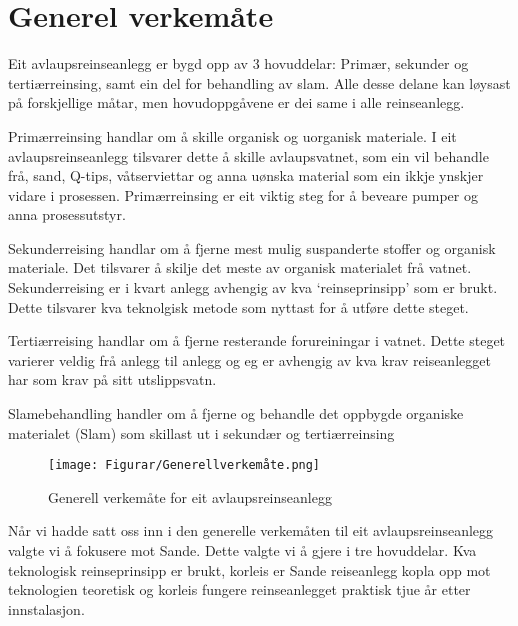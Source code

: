 \section{Generel verkemåte}

Eit avlaupsreinseanlegg er bygd opp av 3 hovuddelar: Primær, sekunder og tertiærreinsing,
samt ein del for behandling av slam.
Alle desse delane kan løysast på forskjellige måtar, men hovudoppgåvene er dei same
i alle reinseanlegg.

Primærreinsing handlar om å skille organisk og uorganisk materiale.
I eit avlaupsreinseanlegg tilsvarer dette å skille avlaupsvatnet, 
som ein vil behandle frå, sand, Q-tips, våtserviettar
og anna uønska material som ein ikkje ynskjer vidare i prosessen. \newline
Primærreinsing er eit viktig steg for å beveare pumper og anna prosessutstyr.

Sekunderreising handlar om å fjerne mest mulig suspanderte stoffer og organisk materiale.
Det tilsvarer å skilje det meste av organisk materialet frå vatnet.
Sekunderreising er i kvart anlegg avhengig av kva `reinseprinsipp' som er brukt. Dette tilsvarer
kva teknolgisk metode som nyttast for å utføre dette steget.

Tertiærreising handlar om å fjerne resterande forureiningar i vatnet.
Dette steget varierer veldig frå anlegg til anlegg og eg er
avhengig av kva krav reiseanlegget har som krav på sitt utslippsvatn.

Slamebehandling handler om å fjerne og behandle det oppbygde organiske materialet (Slam)
som skillast ut i sekundær og tertiærreinsing 

\begin{figure}[htbp]
    \centering
    \texttt{[image: Figurar/Generellverkemåte.png]}
    \caption{Generell verkemåte for eit avlaupsreinseanlegg}\label{fig:HMI}
\end{figure}

Når vi hadde satt oss inn i den generelle verkemåten til eit avlaupsreinseanlegg
valgte vi å fokusere mot Sande.
Dette valgte vi å gjere i tre hovuddelar. Kva teknologisk reinseprinsipp er brukt, korleis er Sande reiseanlegg
kopla opp mot teknologien teoretisk og korleis fungere reinseanlegget praktisk tjue år etter innstalasjon.